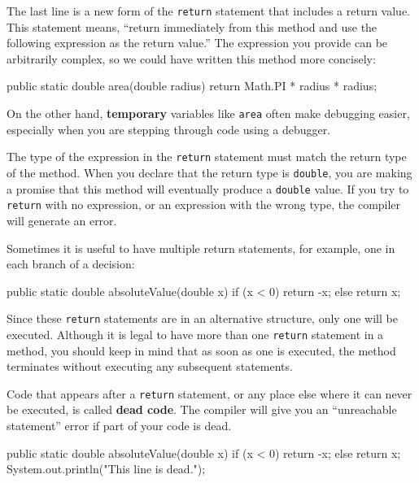 \documentclass[12pt]{book}
\theoremstyle{exercise}
\newcommand{\java}[1]{\verb"#1"}
\newcommand{\java}[1]{\lstinline{#1}} %
\begin{document}
The last line is a new form of the \java{return} statement that includes a return value.
This statement means, ``return immediately from this method and use the following expression as the return value.''
The expression you provide can be arbitrarily complex, so we could have written this method more concisely:

\begin{code}
    public static double area(double radius) {
        return Math.PI * radius * radius;
    }
\end{code}


On the other hand, {\bf temporary} variables like \java{area} often make debugging easier, especially when you are stepping through code using a debugger.

The type of the expression in the \java{return} statement must match the return type of the method.
When you declare that the return type is \java{double}, you are making a promise that this method will eventually produce a \java{double} value.
If you try to \java{return} with no expression, or an expression with the wrong type, the compiler will generate an error.

Sometimes it is useful to have multiple return statements, for example, one in each branch of a decision:

\begin{code}
    public static double absoluteValue(double x) {
        if (x < 0) {
            return -x;
        } else {
            return x;
        }
    }
\end{code}

Since these \java{return} statements are in an alternative structure, only one will be executed.
Although it is legal to have more than one \java{return} statement in a method, you should keep in mind that as soon as one is executed, the method terminates without executing any subsequent statements.


Code that appears after a \java{return} statement, or any place else where it can never be executed, is called {\bf dead code}.
The compiler will give you an ``unreachable statement'' error if part of your code is dead.

\begin{code}
    public static double absoluteValue(double x) {
        if (x < 0) {
            return -x;
        } else {
            return x;
        }
        System.out.println("This line is dead.");
    }
\end{code}
\end{document}
